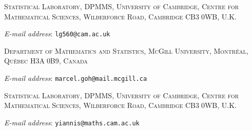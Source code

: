 \documentclass[twoside, 10pt]{article}
\begin{document}

\xpatchcmd{\em}{\itshape}{\slshape}{}{}


\bigskip\noindent
\textsc{Statistical Laboratory, {\small DPMMS}, University of Cambridge, Centre for Mathematical Sciences, Wilberforce Road, Cambridge {\small CB3$\;$0WB}, {\small U.K.}}

\smallskip\noindent
\textsl{E-mail address}: \texttt{lg560@cam.ac.uk}

\bigskip\noindent
\textsc{Department of Mathematics and Statistics, McGill University, Montr\'eal, Qu\'ebec {\small H3A$\;$0B9}, Canada}

\smallskip\noindent
\textsl{E-mail address}: \texttt{marcel.goh@mail.mcgill.ca}

\bigskip\noindent
\textsc{Statistical Laboratory, {\small DPMMS}, University of Cambridge, Centre for Mathematical Sciences, Wilberforce Road, Cambridge {\small CB3$\;$0WB}, {\small U.K.}}

\smallskip\noindent
\textsl{E-mail address}: \texttt{yiannis@maths.cam.ac.uk}
\end{document}
